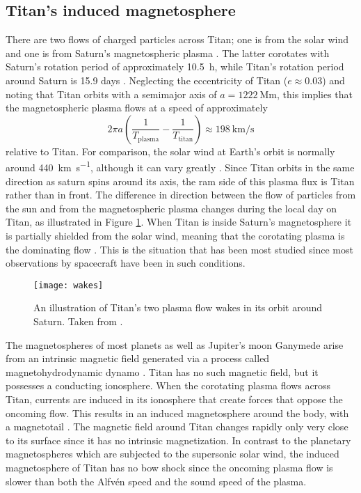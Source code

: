 \documentclass[12pt, parskip=full*, abstract]{scrartcl}
\begin{document}
\subsection{Titan's induced magnetosphere}\label{s:induced-magnetosphere}
There are two flows of charged particles across Titan; one is from the solar wind and one is from Saturn's magnetospheric plasma \parencite{ionosphere-magnetosphere-interaction-coates}. The latter corotates with Saturn's rotation period of approximately \SI{10.5}{\hour}, while Titan's rotation period around Saturn is 15.9 days \parencite{fundamental-planetary-science}. Neglecting the eccentricity of Titan ($e\approx0.03$) and noting that Titan orbits with a semimajor axis of $a=\SI{1222}{\mega\metre}$, this implies that the magnetospheric plasma flows at a speed of approximately
\begin{equation}
	2\pi a\left(\frac{1}{T_\text{plasma}} - \frac{1}{T_\text{titan}}\right)\approx\SI{198}{\kilo\metre\per\second}
\end{equation}
relative to Titan. For comparison, the solar wind at Earth's orbit is normally around \SI{440}{\kilo\metre\per\second}, although it can vary greatly \parencite{encyclopedia-solar-wind}. Since Titan orbits in the same direction as saturn spins around its axis, the ram side of this plasma flux is  Titan rather than in front. The difference in direction between the flow of particles from the sun and from the magnetospheric plasma changes during the local day on Titan, as illustrated in Figure \ref{wakes}. When Titan is inside Saturn's magnetosphere it is partially shielded from the solar wind, meaning that the corotating plasma is the dominating flow \parencite{ionosphere-magnetosphere-interaction-coates}. This is the situation that has been most studied since most observations by spacecraft have been in such conditions.

\begin{figure}[htbp]
	\centering
	\texttt{[image: wakes]}
	\caption{An illustration of Titan's two plasma flow wakes in its orbit around Saturn. Taken from \textcite{ionosphere-magnetosphere-interaction-coates}.}
	\label{wakes}
\end{figure}

The magnetospheres of most planets as well as Jupiter's moon Ganymede arise from an intrinsic magnetic field generated via a process called magnetohydrodynamic dynamo \parencite{encyclopedia-magnetospheres}. Titan has no such magnetic field, but it possesses a conducting ionosphere. When the corotating plasma flows across Titan, currents are induced in its ionosphere that create forces that oppose the oncoming flow. This results in an induced magnetosphere around the body, with a magnetotail . The magnetic field around Titan changes rapidly only very close to its surface since it has no intrinsic magnetization. In contrast to the planetary magnetospheres which are subjected to the supersonic solar wind, the induced magnetosphere of Titan has no bow shock since the oncoming plasma flow is slower than both the Alfvén speed and the sound speed of the plasma. 
\end{document}
